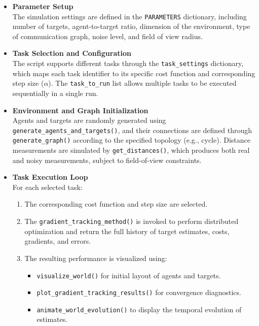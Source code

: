 \begin{itemize}
    \item \textbf{Parameter Setup} \\
    The simulation settings are defined in the \texttt{PARAMETERS} dictionary, including number of targets, agent-to-target ratio, dimension of the environment, type of 
    communication graph, noise level, and field of view radius. 

    \item \textbf{Task Selection and Configuration} \\
    The script supports different tasks through the \texttt{task\_settings} dictionary, which maps each task identifier to its specific cost function and corresponding step size 
    (\( \alpha \)). The \texttt{task\_to\_run} list allows multiple tasks to be executed sequentially in a single run.

    \item \textbf{Environment and Graph Initialization} \\
    Agents and targets are randomly generated using \texttt{generate\_agents\_and\_targets()}, and their connections are defined through \texttt{generate\_graph()} according to 
    the specified topology (e.g., cycle). Distance measurements are simulated by \texttt{get\_distances()}, which produces both real and noisy measurements, subject to field-of-view 
    constraints.

    \item \textbf{Task Execution Loop} \\
    For each selected task:
    \begin{enumerate}
        \item The corresponding cost function and step size are selected.
        \item The \texttt{gradient\_tracking\_method()} is invoked to perform distributed optimization and return the full history of target estimates, costs, gradients, and errors.
        \item The resulting performance is visualized using:
        \begin{itemize}
            \item \texttt{visualize\_world()} for initial layout of agents and targets.
            \item \texttt{plot\_gradient\_tracking\_results()} for convergence diagnostics.
            \item \texttt{animate\_world\_evolution()} to display the temporal evolution of estimates.
        \end{itemize}
    \end{enumerate}

\end{itemize}
